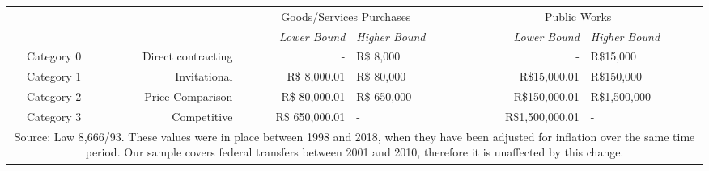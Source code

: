 \documentclass[border = 1pt]{standalone}
\begin{document}
\scriptsize
\setlength{\tabcolsep}{2pt}
\begin{tabular}{crrl@{\extracolsep{6pt}}rl}
\hline
\hline
& & \multicolumn{2}{c}{Goods/Services Purchases} & \multicolumn{2}{c}{Public Works} \\[1.0ex]
\cline{3-4} \cline{5-6}
           &                    & \emph{Lower Bound} & \emph{Higher Bound} & \emph{Lower Bound} & \emph{Higher Bound} \\[1.0ex]
\hline
Category 0 & Direct contracting & -                  & R\$ 8,000           & -                  & R\$15,000           \\[1.0ex]
Category 1 & Invitational       & R\$ 8,000.01       & R\$ 80,000          & R\$15,000.01       & R\$150,000          \\[1.0ex]
Category 2 & Price Comparison   & R\$ 80,000.01      & R\$ 650,000         & R\$150,000.01      & R\$1,500,000        \\[1.0ex]
Category 3 & Competitive        & R\$ 650,000.01     & -                   & R\$1,500,000.01    & -                   \\[1.0ex]
\hline
\hline
\multicolumn{6}{p{12.6cm}}{\scriptsize Source: Law 8,666/93. These values were in place between 1998 and 2018, when they have been adjusted for inflation over the same time period. Our sample covers federal transfers between 2001 and 2010, therefore it is unaffected by this change.}
\end{tabular}
\end{document}
